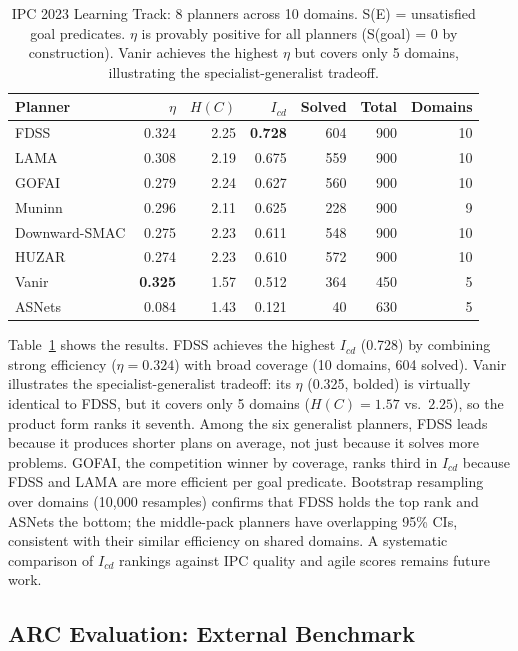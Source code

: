 \documentclass[runningheads,a4paper]{llncs}
\begin{document}
\begin{table}[t]
\centering
\caption{IPC 2023 Learning Track: 8 planners across 10 domains. S(E) = unsatisfied goal predicates. $\eta$ is provably positive for all planners (S(goal) = 0 by construction). Vanir achieves the highest $\eta$ but covers only 5 domains, illustrating the specialist-generalist tradeoff.}
\label{tab:ipc}
\small
\begin{tabular}{lrrrrrr}
\toprule
Planner & $\eta$ & $H(C)$ & $I_{cd}$ & Solved & Total & Domains \\
\midrule
FDSS & 0.324 & 2.25 & \textbf{0.728} & 604 & 900 & 10 \\
LAMA & 0.308 & 2.19 & 0.675 & 559 & 900 & 10 \\
GOFAI & 0.279 & 2.24 & 0.627 & 560 & 900 & 10 \\
Muninn & 0.296 & 2.11 & 0.625 & 228 & 900 & 9 \\
Downward-SMAC & 0.275 & 2.23 & 0.611 & 548 & 900 & 10 \\
HUZAR & 0.274 & 2.23 & 0.610 & 572 & 900 & 10 \\
\midrule
Vanir & \textbf{0.325} & 1.57 & 0.512 & 364 & 450 & 5 \\
ASNets & 0.084 & 1.43 & 0.121 & 40 & 630 & 5 \\
\bottomrule
\end{tabular}
\end{table}

Table~\ref{tab:ipc} shows the results. FDSS achieves the highest $I_{cd}$ (0.728) by combining strong efficiency ($\eta = 0.324$) with broad coverage (10 domains, 604 solved). Vanir illustrates the specialist-generalist tradeoff: its $\eta$ (0.325, bolded) is virtually identical to FDSS, but it covers only 5 domains ($H(C) = 1.57$ vs.\ $2.25$), so the product form ranks it seventh. Among the six generalist planners, FDSS leads because it produces shorter plans on average, not just because it solves more problems. GOFAI, the competition winner by coverage, ranks third in $I_{cd}$ because FDSS and LAMA are more efficient per goal predicate. Bootstrap resampling over domains (10{,}000 resamples) confirms that FDSS holds the top rank and ASNets the bottom; the middle-pack planners have overlapping 95\% CIs, consistent with their similar efficiency on shared domains. A systematic comparison of $I_{cd}$ rankings against IPC quality and agile scores remains future work.

\subsection{ARC Evaluation: External Benchmark}
\label{sec:arc}
\end{document}
